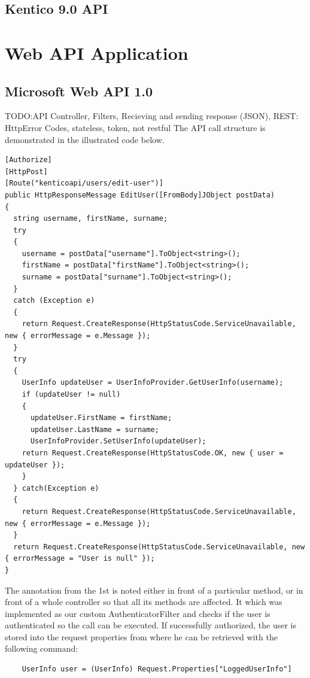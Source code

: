 \subsection{Kentico 9.0 API}

\section{Web API Application}
\subsection{Microsoft Web API 1.0}
TODO:API Controller, Filters, Recieving and sending response (JSON), REST: HttpError Codes, stateless, token, not restful
The API call structure is demonstrated in the illustrated code below. 
\lstset{style=sharpc, numbers=left}
\begin{lstlisting}
[Authorize]
[HttpPost]
[Route("kenticoapi/users/edit-user")]
public HttpResponseMessage EditUser([FromBody]JObject postData)
{
  string username, firstName, surname;
  try
  {
    username = postData["username"].ToObject<string>();
    firstName = postData["firstName"].ToObject<string>(); 
    surname = postData["surname"].ToObject<string>();
  }
  catch (Exception e)
  {
    return Request.CreateResponse(HttpStatusCode.ServiceUnavailable, new { errorMessage = e.Message });
  }
  try
  {
    UserInfo updateUser = UserInfoProvider.GetUserInfo(username);
    if (updateUser != null)
    {
      updateUser.FirstName = firstName;
      updateUser.LastName = surname;
      UserInfoProvider.SetUserInfo(updateUser);
    return Request.CreateResponse(HttpStatusCode.OK, new { user = updateUser });
    }
  } catch(Exception e)
  {
    return Request.CreateResponse(HttpStatusCode.ServiceUnavailable, new { errorMessage = e.Message });
  }
  return Request.CreateResponse(HttpStatusCode.ServiceUnavailable, new { errorMessage = "User is null" });
}
\end{lstlisting}
The annotation from the 1st is noted either in front of a particular method, or in front of a whole controller so that all its methods are affected. It which was implemented as our custom AuthenticatorFilter and checks if the user is authenticated so the call can be executed. If successfully authorized, the user is stored into the request properties from where he can be retrieved with the following command:
\lstset{style=sharpc, numbers = none}
\begin{lstlisting}
	UserInfo user = (UserInfo) Request.Properties["LoggedUserInfo"]
\end{lstlisting}
